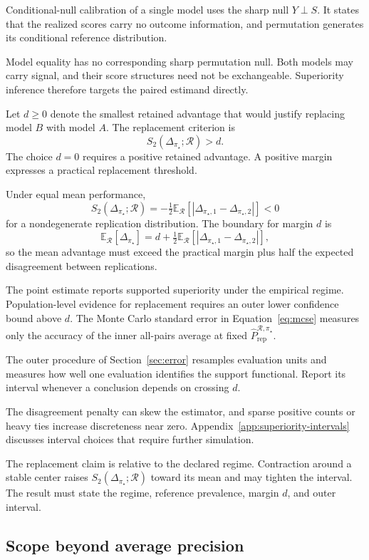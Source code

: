 \documentclass[11pt]{article}
\newcommand{\Regime}{\mathcal{R}}
\newcommand{\E}{\mathbb{E}}
\newcommand{\PRepHat}{\widehat{P}_{\mathrm{rep}}^{\Regime,\pi_\star}}
\theoremstyle{remark}
\begin{document}
Conditional-null calibration of a single model uses the sharp null $Y\perp S$. It states that the realized scores carry no outcome information, and permutation generates its conditional reference distribution.

Model equality has no corresponding sharp permutation null. Both models may carry signal, and their score structures need not be exchangeable. Superiority inference therefore targets the paired estimand directly.

Let $d\geq0$ denote the smallest retained advantage that would justify replacing model $B$ with model $A$. The replacement criterion is
\[
S_2(\Delta_{\pi_\star};\Regime)>d .
\]
The choice $d=0$ requires a positive retained advantage. A positive margin expresses a practical replacement threshold.

Under equal mean performance,
\[
S_2(\Delta_{\pi_\star};\Regime)
=
-\tfrac12\E_{\Regime}\left[|\Delta_{\pi_\star,1}-\Delta_{\pi_\star,2}|\right]
<
0
\]
for a nondegenerate replication distribution. The boundary for margin $d$ is
\[
\E_{\Regime}[\Delta_{\pi_\star}]
=
d+\tfrac12
\E_{\Regime}\left[|\Delta_{\pi_\star,1}-\Delta_{\pi_\star,2}|\right],
\]
so the mean advantage must exceed the practical margin plus half the expected disagreement between replications.

The point estimate reports supported superiority under the empirical regime. Population-level evidence for replacement requires an outer lower confidence bound above $d$. The Monte Carlo standard error in Equation~\eqref{eq:mcse} measures only the accuracy of the inner all-pairs average at fixed $\PRepHat$.

The outer procedure of Section~\ref{sec:error} resamples evaluation units and measures how well one evaluation identifies the support functional. Report its interval whenever a conclusion depends on crossing $d$.

The disagreement penalty can skew the estimator, and sparse positive counts or heavy ties increase discreteness near zero. Appendix~\ref{app:superiority-intervals} discusses interval choices that require further simulation.

The replacement claim is relative to the declared regime. Contraction around a stable center raises $S_2(\Delta_{\pi_\star};\Regime)$ toward its mean and may tighten the interval. The result must state the regime, reference prevalence, margin $d$, and outer interval.


\subsection{Scope beyond average precision}
\end{document}
